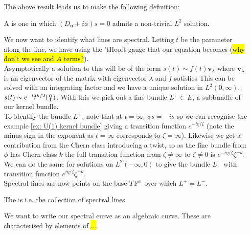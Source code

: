 \documentclass{article}
\begin{document}
The above result leads us to make the following definition:
\begin{definition}
	A  is one in which $(D_{\bm{u}}+i\phi)s=0$ admits a non-trivial $L^2$ solution.
\end{definition}
We now want to identify what lines are spectral. Letting $t$ be the parameter along the line, we have using the 'tHooft gauge that our equation becomes 
(\hl{why don't we see and $A$ terms?}). \\
Asymptotically a solution to this will be of the form $s(t) \sim f(t)\bm{v}_\lambda$ where $\bm{v}_\lambda$ is an eigenvector of the matrix with eigenvector $\lambda$ and $f$ satisfies 
This can be solved with an integrating factor and we have a unique solution in $L^2(0,\infty)$,  $s(t) \sim e^{-t} t^{k/2} \begin{psmallmatrix} 0 \\ 1 \end{psmallmatrix}$. With this we pick out a line bundle $L^+ \subset E$, a subbundle of our kernel bundle. \\
To identify the bundle $L^+$, note that at $t=\infty$, $\phi s = -i s$ so we can recognise the example \ref{ex: U(1) kernel bundle} giving a transition function $e^{-i\eta/\zeta}$ (note the minus sign in the exponent as $t=\infty$ corresponds to $\zeta=\infty$). Likewise we get a contribution from the Chern class introducing a twist, so as the line bundle from $\phi$ has Chern class $k$ the full transition function from $\zeta\neq \infty$ to $\zeta \neq 0$ is $e^{-i\eta/\zeta} \zeta^{-k}$. We can do the same for solutions on $L^2(-\infty,0)$ to give the bundle $L^-$ with transition function $e^{i\eta/\zeta} \zeta^{-k}$. \\
Spectral lines are now points on the base $T\mathbb{P}^1$ over which $L^+=L^-$.
\begin{definition}
	The  is 
i.e. the collection of spectral lines
\end{definition}
We want to write our spectral curve as an algebraic curve. These are characterised by elements of \hl{...}.
\end{document}
